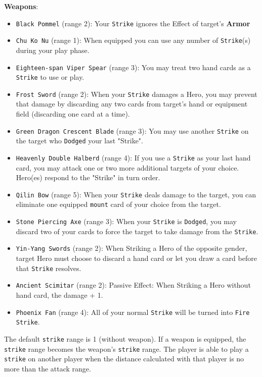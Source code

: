 \documentclass[11pt,a4paper]{article}
\begin{document}
\textbf{Weapons}: 
\begin{itemize}
\item \texttt{Black Pommel} (range 2): Your \texttt{Strike} ignores the Effect of target's \textbf{Armor}
\item \texttt{Chu Ko Nu} (range 1): When equipped you can use any number of \texttt{Strike}(s) during your play phase.
\item \texttt{Eighteen-span Viper Spear} (range 3): You may treat two hand cards as a \texttt{Strike} to use or play.
\item \texttt{Frost Sword} (range 2): When your \texttt{Strike} damages a Hero, you may prevent that damage by discarding any two cards from target's hand or equipment field (discarding one card at a time).
\item \texttt{Green Dragon Crescent Blade} (range 3): You may use another \texttt{Strike} on the target who \texttt{Dodged} your last "Strike".
\item \texttt{Heavenly Double Halberd} (range 4): If you use a \texttt{Strike} as your last hand card, you may attack one or two more additional targets of your choice. Hero(es) respond to the "Strike" in turn order.
\item \texttt{Qilin Bow} (range 5): When your \texttt{Strike} deals damage to the target, you can eliminate one equipped \texttt{mount} card of your choice from the target.
\item \texttt{Stone Piercing Axe} (range 3): When your \texttt{Strike} is \texttt{Dodged}, you may discard two of your cards to force the target to take damage from the \texttt{Strike}.
\item \texttt{Yin-Yang Swords} (range 2): When Striking a Hero of the opposite gender, target Hero must choose to discard a hand card or let you draw a card before that \texttt{Strike} resolves.
\item \texttt{Ancient Scimitar} (range 2): Passive Effect: When Striking a Hero without hand card, the damage + 1.
\item \texttt{Phoenix Fan} (range 4): All of your normal \texttt{Strike} will be turned into \texttt{Fire Strike}.
\end{itemize}

The default \texttt{strike} range is 1 (without weapon). If a weapon is equipped, the \texttt{strike} range becomes the weapon's \texttt{strike} range. The player is able to play a \texttt{strike} on another player when the distance calculated with that player is no more than the attack range.
\end{document}

